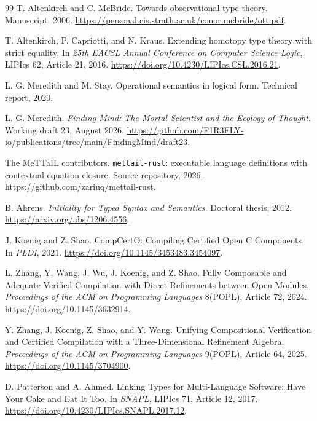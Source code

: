 \documentclass[11pt]{article}
\theoremstyle{definition}
\theoremstyle{remark}
\begin{document}
\begin{thebibliography}{99}
T. Altenkirch and C. McBride.
\newblock Towards observational type theory.
\newblock Manuscript, 2006.
\newblock \url{https://personal.cis.strath.ac.uk/conor.mcbride/ott.pdf}.

T. Altenkirch, P. Capriotti, and N. Kraus.
\newblock Extending homotopy type theory with strict equality.
\newblock In \emph{25th EACSL Annual Conference on Computer Science Logic},
  LIPIcs 62, Article 21, 2016.
\newblock \url{https://doi.org/10.4230/LIPIcs.CSL.2016.21}.

L. G. Meredith and M. Stay.
\newblock Operational semantics in logical form.
\newblock Technical report, 2020.

L. G. Meredith.
\newblock \emph{Finding Mind: The Mortal Scientist and the Ecology of
  Thought}.
\newblock Working draft 23, August 2026.
\newblock \url{https://github.com/F1R3FLY-io/publications/tree/main/FindingMind/draft23}.

The MeTTaIL contributors.
\newblock \texttt{mettail-rust}: executable language definitions with
  contextual equation closure.
\newblock Source repository, 2026.
\newblock \url{https://github.com/zariuq/mettail-rust}.

B. Ahrens.
\newblock \emph{Initiality for Typed Syntax and Semantics}.
\newblock Doctoral thesis, 2012.
\newblock \url{https://arxiv.org/abs/1206.4556}.

J. Koenig and Z. Shao.
\newblock CompCertO: Compiling Certified Open C Components.
\newblock In \emph{PLDI}, 2021.
\newblock \url{https://doi.org/10.1145/3453483.3454097}.

L. Zhang, Y. Wang, J. Wu, J. Koenig, and Z. Shao.
\newblock Fully Composable and Adequate Verified Compilation with Direct
  Refinements between Open Modules.
\newblock \emph{Proceedings of the ACM on Programming Languages}
  8(POPL), Article 72, 2024.
\newblock \url{https://doi.org/10.1145/3632914}.

Y. Zhang, J. Koenig, Z. Shao, and Y. Wang.
\newblock Unifying Compositional Verification and Certified Compilation
  with a Three-Dimensional Refinement Algebra.
\newblock \emph{Proceedings of the ACM on Programming Languages}
  9(POPL), Article 64, 2025.
\newblock \url{https://doi.org/10.1145/3704900}.

D. Patterson and A. Ahmed.
\newblock Linking Types for Multi-Language Software: Have Your Cake and Eat It Too.
\newblock In \emph{SNAPL}, LIPIcs 71, Article 12, 2017.
\newblock \url{https://doi.org/10.4230/LIPIcs.SNAPL.2017.12}.


\end{thebibliography}
\end{document}
